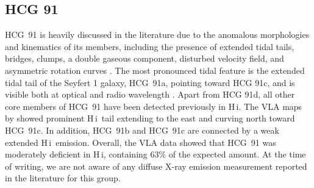 \documentclass{aa}
\newcommand{\HI}{H\,{\sc i}}
\begin{document}
\subsection{HCG 91}
HCG~91 is heavily discussed in the literature due to the anomalous 
morphologies and kinematics of its members, including the presence of extended tidal tails, bridges, clumps, a double gaseous component, disturbed velocity field, 
and asymmetric rotation curves \citep{2001MNRAS.324..859B, 2003A&A...402..865A, 2003AJ....126.2635M, 2015MNRAS.450.2593V, 2016ApJ...818..115V}. The most pronounced 
tidal feature is the extended tidal tail of the Seyfert 1 galaxy, HCG~91a, pointing toward HCG 91c, and is visible both at optical \citep{2015MNRAS.451.2793E} and 
radio wavelength \citep{2003A&A...402..865A, 2016ApJ...818..115V, 2023A&A...670A..21J}. 
Apart from HCG 91d, all other core members of HCG~91 have been detected previously in \HI. The VLA maps by \citet{2023A&A...670A..21J} showed 
prominent \HI\ tail extending to the east and curving north toward HCG~91c. In addition, HCG~91b and HCG~91c are connected by a weak extended \HI\ emission. 
Overall, the VLA data showed that HCG~91 was moderately deficient in \HI, containing 63\% of the expected amount. At the time of writing, we are not 
aware of any diffuse X-ray emission measurement reported in the literature for this group.   
\end{document}
